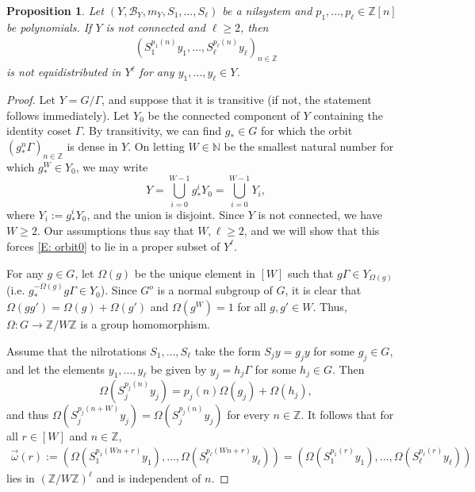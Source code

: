 \documentclass[11pt]{amsart}
\newtheorem{proposition}[lemma]{Proposition}
\theoremstyle{definition}
\newcommand{\N}{{\mathbb N}}
\newcommand{\Z}{{\mathbb Z}}
\newcommand{\CB}{{\mathcal B}}
\newcommand{\1}{{\mathbf{1}}}
\begin{document}
    \begin{proposition}\label{P:dcc}
     Let $(Y, \CB_Y, m_Y, S_1, \ldots, S_\ell)$ be a nilsystem and $p_1, \ldots, p_\ell\in\Z[n]$ be polynomials. If $Y$ is not connected and $\ell\geq 2$, then  
  \begin{align}\label{E: orbit0}
        (S_1^{p_1(n)}y_{1}, \ldots, S_\ell^{p_\ell(n)}y_{\ell})_{n\in\Z}
    \end{align}
    is  not equidistributed in $Y^{\ell}$ for any $y_{1},\dots,y_{\ell}\in Y$.
\end{proposition}
 \begin{proof}
   Let $Y = G/\Gamma$, and suppose that it is transitive (if not, the statement follows immediately). %
   Let $Y_0$ be the connected component of $Y$ containing the identity coset $\Gamma$. By transitivity, we can find $g_{\ast}\in G$ for which the orbit $(g_{\ast}^{n}\Gamma)_{n\in\Z}$ is dense in $Y$. On letting $W\in\N$ be the smallest natural number for which $g_{\ast}^{W}\in Y_{0}$, we may write $$Y=\bigcup\limits_{i=0}^{W-1}g^{i}_{\ast}Y_{0}=\bigcup_{i=0}^{W-1}Y_{i},$$
    where $Y_i:= g^i_\ast Y_0$, and the union is disjoint. Since $Y$ is not connected, we have $W\geq 2$. Our assumptions thus say that $W, \ell\geq 2$, and we will show that this forces \eqref{E: orbit0} to lie in a proper subset of $Y^\ell$.

 For any $g\in G$, let $\Omega(g)$ be the unique element in $[W]$ such that $g\Gamma\in Y_{\Omega(g)}$ (i.e. $g^{-\Omega(g)}_{\ast}g\Gamma\in Y_{0}$). Since $G^o$ is a normal subgroup of $G$, it is clear that $\Omega(gg')=\Omega(g)+\Omega(g')$ and $\Omega(g^W) = 1$ for all $g,g'\in W$. Thus, $\Omega\colon G\to \Z/W\Z$ is a group homomorphism.
   
   
   Assume that the nilrotations $S_1, \ldots, S_\ell$ take the form $S_{j}y=g_{j}y$ for some $g_j\in G$, and let the elements $y_1, \ldots, y_\ell$ be given by $y_{j}=h_{j}\Gamma$ for some $h_j\in G$. Then $$\Omega(S_{j}^{p_{j}(n)}y_{j})=p_{j}(n)\Omega(g_j)+\Omega(h_j),$$ and thus $\Omega(S_j^{p_j(n+W)}y_{j})=\Omega(S_j^{p_j(n)}y_{j})$ for every $n\in\Z$. It follows that for all $r\in [W]$ and $n\in\Z$, 
      \begin{align*}
   \vec{\omega}(r):=(\Omega(S_{1}^{p_{1}(Wn+r)}y_{1}),\dots,\Omega(S_{\ell}^{p_{\ell}(Wn+r)}y_{\ell}))
   =(\Omega(S_{1}^{p_{1}(r)}y_{1}),\dots,\Omega(S_{\ell}^{p_{\ell}(r)}y_{\ell}))    
   \end{align*}
   lies in $(\Z/W\Z)^{\ell}$ and is independent of $n$.


\end{proof}
\end{document}
